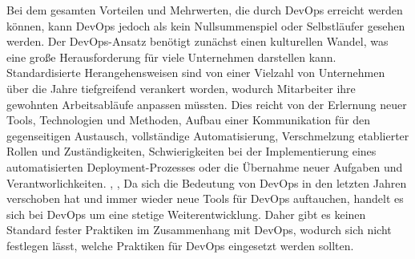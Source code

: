 Bei dem gesamten Vorteilen und Mehrwerten, die durch DevOps erreicht werden können, kann DevOps jedoch als kein Nullsummenspiel oder Selbstläufer gesehen werden. \cite{humble_why_2011} Der DevOps-Ansatz benötigt zunächst einen kulturellen Wandel, was eine große Herausforderung für viele Unternehmen darstellen kann. Standardisierte Herangehensweisen sind von einer Vielzahl von Unternehmen über die Jahre tiefgreifend verankert worden, wodurch Mitarbeiter ihre gewohnten Arbeitsabläufe anpassen müssten. Dies reicht von der Erlernung neuer Tools, Technologien und Methoden, Aufbau einer Kommunikation für den gegenseitigen Austausch, vollständige Automatisierung, Verschmelzung etablierter Rollen und Zuständigkeiten, Schwierigkeiten bei der Implementierung eines automatisierten Deployment-Prozesses oder die Übernahme neuer Aufgaben und Verantworlichkeiten. \cite{lwakatare_devops_2019}, \cite[S. 594 - 595]{abrahamsson_product-focused_2016}, \cite[S. 43 - 45]{halstenberg_devops_2020} Da sich die Bedeutung von DevOps in den letzten Jahren verschoben hat und immer wieder neue Tools für DevOps auftauchen, handelt es sich bei DevOps um eine stetige Weiterentwicklung. \cite[S. 595]{abrahamsson_product-focused_2016} Daher gibt es keinen Standard fester Praktiken im Zusammenhang mit DevOps, wodurch sich nicht festlegen lässt, welche Praktiken für DevOps eingesetzt werden sollten. 









